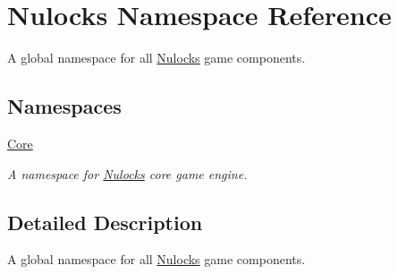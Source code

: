 \hypertarget{namespace_nulocks}{\section{Nulocks Namespace Reference}
\label{namespace_nulocks}
}


A global namespace for all \hyperlink{namespace_nulocks}{Nulocks} game components.  


\subsection*{Namespaces}
\begin{DoxyCompactItemize}
\item 
\hyperlink{namespace_nulocks_1_1_core}{Core}
\begin{DoxyCompactList}\small\item\em A namespace for \hyperlink{namespace_nulocks}{Nulocks} core game engine. \end{DoxyCompactList}\end{DoxyCompactItemize}


\subsection{Detailed Description}
A global namespace for all \hyperlink{namespace_nulocks}{Nulocks} game components. 